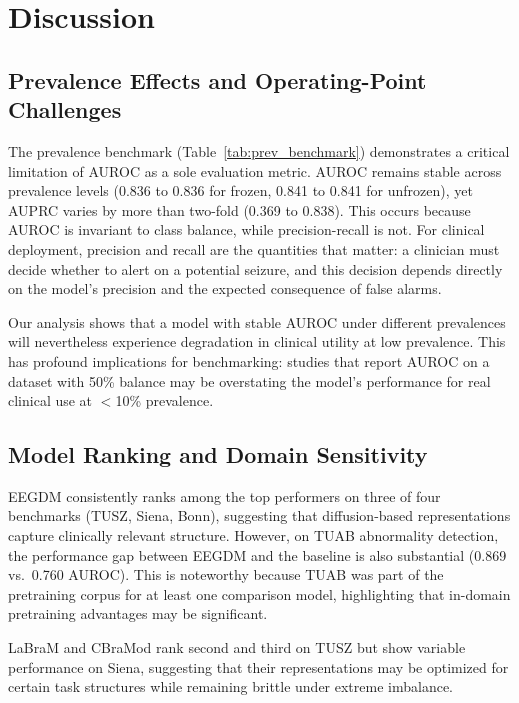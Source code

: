 \documentclass[journal]{IEEEtran}
\begin{document}
\section{Discussion}

\subsection{Prevalence Effects and Operating-Point Challenges}

The prevalence benchmark (Table~\ref{tab:prev_benchmark}) demonstrates a critical limitation of AUROC as a sole evaluation metric. AUROC remains stable across prevalence levels (0.836 to 0.836 for frozen, 0.841 to 0.841 for unfrozen), yet AUPRC varies by more than two-fold (0.369 to 0.838). This occurs because AUROC is invariant to class balance, while precision-recall is not. For clinical deployment, precision and recall are the quantities that matter: a clinician must decide whether to alert on a potential seizure, and this decision depends directly on the model's precision and the expected consequence of false alarms.

Our analysis shows that a model with stable AUROC under different prevalences will nevertheless experience degradation in clinical utility at low prevalence. This has profound implications for benchmarking: studies that report AUROC on a dataset with 50\% balance may be overstating the model's performance for real clinical use at $<$10\% prevalence.

\subsection{Model Ranking and Domain Sensitivity}

EEGDM consistently ranks among the top performers on three of four benchmarks (TUSZ, Siena, Bonn), suggesting that diffusion-based representations capture clinically relevant structure. However, on TUAB abnormality detection, the performance gap between EEGDM and the baseline is also substantial (0.869 vs.\ 0.760 AUROC). This is noteworthy because TUAB was part of the pretraining corpus for at least one comparison model, highlighting that in-domain pretraining advantages may be significant.

LaBraM and CBraMod rank second and third on TUSZ but show variable performance on Siena, suggesting that their representations may be optimized for certain task structures while remaining brittle under extreme imbalance.
\end{document}
